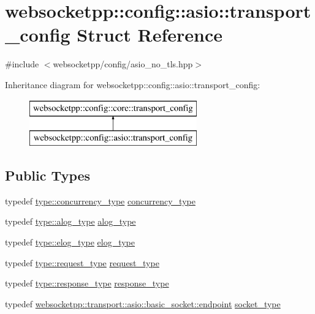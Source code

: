 \hypertarget{structwebsocketpp_1_1config_1_1asio_1_1transport__config}{}\section{websocketpp\+:\+:config\+:\+:asio\+:\+:transport\+\_\+config Struct Reference}
\label{structwebsocketpp_1_1config_1_1asio_1_1transport__config}


{\ttfamily \#include $<$websocketpp/config/asio\+\_\+no\+\_\+tls.\+hpp$>$}

Inheritance diagram for websocketpp\+:\+:config\+:\+:asio\+:\+:transport\+\_\+config\+:\begin{figure}[H]
\begin{center}
\leavevmode
\includegraphics[height=2.000000cm]{structwebsocketpp_1_1config_1_1asio_1_1transport__config}
\end{center}
\end{figure}
\subsection*{Public Types}
\begin{DoxyCompactItemize}
\item 
typedef \hyperlink{structwebsocketpp_1_1config_1_1asio_a4f2036249aa6a4a627ac42cc38cdaa06}{type\+::concurrency\+\_\+type} \hyperlink{structwebsocketpp_1_1config_1_1asio_1_1transport__config_a512d44142c4cf52cc732eb13e9901405}{concurrency\+\_\+type}
\item 
typedef \hyperlink{structwebsocketpp_1_1config_1_1asio_a128280d7b2ff8256e10f23050a89549d}{type\+::alog\+\_\+type} \hyperlink{structwebsocketpp_1_1config_1_1asio_1_1transport__config_a524e5797844731f20c0513d6b4857b34}{alog\+\_\+type}
\item 
typedef \hyperlink{structwebsocketpp_1_1config_1_1asio_a67f2a92d70443a37f25ffbc08a6a9c3d}{type\+::elog\+\_\+type} \hyperlink{structwebsocketpp_1_1config_1_1asio_1_1transport__config_a269e16af2262a7b1a9165e488b2dc651}{elog\+\_\+type}
\item 
typedef \hyperlink{structwebsocketpp_1_1config_1_1asio_ab378f1fa9cdbf4736b0202666c9abe53}{type\+::request\+\_\+type} \hyperlink{structwebsocketpp_1_1config_1_1asio_1_1transport__config_a5bd4b592ae10c2c5df22cf894c3db62b}{request\+\_\+type}
\item 
typedef \hyperlink{structwebsocketpp_1_1config_1_1asio_a2336ebfd28c36b1e66257ae57ad5296c}{type\+::response\+\_\+type} \hyperlink{structwebsocketpp_1_1config_1_1asio_1_1transport__config_ac6bbac6039c4723a7a59892b77437697}{response\+\_\+type}
\item 
typedef \hyperlink{classwebsocketpp_1_1transport_1_1asio_1_1basic__socket_1_1endpoint}{websocketpp\+::transport\+::asio\+::basic\+\_\+socket\+::endpoint} \hyperlink{structwebsocketpp_1_1config_1_1asio_1_1transport__config_a7ad5fe6e1bb71633a8d75125a8388c43}{socket\+\_\+type}
\end{DoxyCompactItemize}
